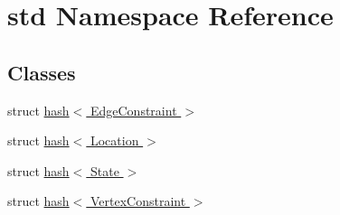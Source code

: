 \hypertarget{namespacestd}{}\section{std Namespace Reference}
\label{namespacestd}
\subsection*{Classes}
\begin{DoxyCompactItemize}
\item 
struct \hyperlink{structstd_1_1hash_3_01_edge_constraint_01_4}{hash$<$ Edge\+Constraint $>$}
\item 
struct \hyperlink{structstd_1_1hash_3_01_location_01_4}{hash$<$ Location $>$}
\item 
struct \hyperlink{structstd_1_1hash_3_01_state_01_4}{hash$<$ State $>$}
\item 
struct \hyperlink{structstd_1_1hash_3_01_vertex_constraint_01_4}{hash$<$ Vertex\+Constraint $>$}
\end{DoxyCompactItemize}
